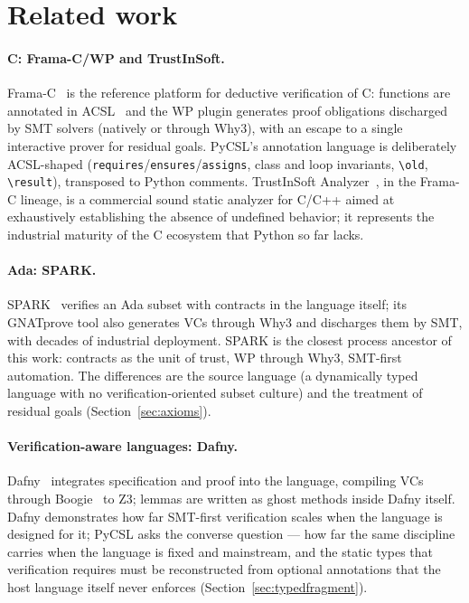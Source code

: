 \documentclass[11pt]{article}
\newcommand{\pycsl}{\textsf{PyCSL}}
\newcommand{\why}{\textsf{Why3}}
\newcommand{\zthree}{\textsf{Z3}}
\begin{document}
\section{Related work}\label{sec:related}

\paragraph{C: Frama-C/WP and TrustInSoft.}
Frama-C~\cite{framac} is the reference platform for deductive verification of
C: functions are annotated in ACSL~\cite{acsl} and the WP plugin generates
proof obligations discharged by SMT solvers (natively or through \why{}),
with an escape to a single interactive prover for residual goals. \pycsl{}'s
annotation language is deliberately ACSL-shaped
(\texttt{requires}/\texttt{ensures}/\texttt{assigns}, class and loop
invariants, \texttt{\textbackslash old}, \texttt{\textbackslash result}),
transposed to Python comments. TrustInSoft Analyzer~\cite{tis}, in the
Frama-C lineage, is a commercial sound static analyzer for C/C++ aimed at
exhaustively establishing the absence of undefined behavior; it represents
the industrial maturity of the C ecosystem that Python so far lacks.

\paragraph{Ada: SPARK.}
SPARK~\cite{sparkbook,spark20} verifies an Ada subset with contracts in the
language itself; its GNATprove tool also generates VCs through \why{} and
discharges them by SMT, with decades of industrial deployment. SPARK is the
closest process ancestor of this work: contracts as the unit of trust,
WP through \why{}, SMT-first automation. The differences are the source
language (a dynamically typed language with no verification-oriented subset
culture) and the treatment of residual goals (Section~\ref{sec:axioms}).

\paragraph{Verification-aware languages: Dafny.}
Dafny~\cite{dafny} integrates specification and proof into the language,
compiling VCs through Boogie~\cite{boogie} to \zthree{}; lemmas are written
as ghost methods inside Dafny itself. Dafny demonstrates how far SMT-first
verification scales when the language is designed for it; \pycsl{} asks the
converse question --- how far the same discipline carries when the language
is fixed and mainstream, and the static types that verification requires
must be reconstructed from optional annotations that the host language
itself never enforces (Section~\ref{sec:typedfragment}).
\end{document}
